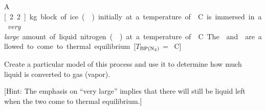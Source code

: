 \label{fnt1.2.1-6}

A \unit[2.2]{kg} block of ice () initially at a temperature of \unit[-20]{\textdegree C} is immersed in a \emph{very large} amount of liquid nitrogen () at a temperature of \unit[-196]{\textdegree C}. The  and  are allowed to come to thermal equilibrium.  [$T$$_\text{BP(\ce{N2})}$ = \unit[-196]{\textdegree C}]

Create a particular model of this process and use it to determine how much liquid  is converted to gas (vapor).

[Hint: The emphasis on ``very large'' implies that there will still be liquid  left when the two come to thermal equilibrium.]
